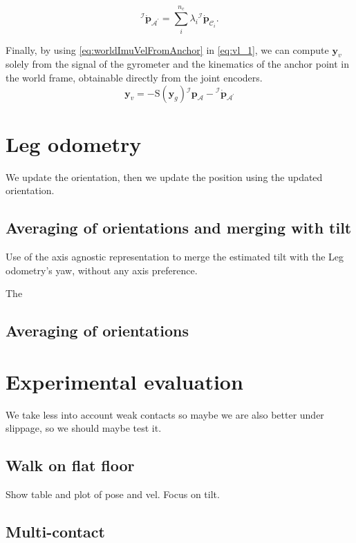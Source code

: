 \documentclass{IJCAS}
\begin{document}
\begin{equation}
    {^{\mathcal{I}}} \dot{\boldsymbol{p}}_{\mathcal{A}^{\prime}} = \sum^{n_{c}}_{i} \lambda_{i}  {^{\mathcal{I}}} \dot{\boldsymbol{p}}_{{\mathcal{C}}_{i}}.
\end{equation}

Finally, by using \eqref{eq:worldImuVelFromAnchor} in \eqref{eq:vl_1}, we can compute $\boldsymbol{y}_{v}$ solely from the signal of the gyrometer and the kinematics of the anchor point in the world frame, obtainable directly from the joint encoders.
\begin{equation}
    \boldsymbol{y}_v = - \text{S}\!\left( {\boldsymbol{y}_{g}} \right) {^{\mathcal{I}}}\boldsymbol{p}_{\mathcal{A}} - {^{\mathcal{I}}} \dot{\boldsymbol{p}}_{\mathcal{A}^{\prime}}
\end{equation}

\section{Leg odometry}


We update the orientation, then we update the position using the updated orientation.
\subsection{Averaging of orientations and merging with tilt}
Use of the axis agnostic representation to merge the estimated tilt with the Leg odometry's yaw, without any axis preference.

The 
\subsection{Averaging of orientations}



\section{Experimental evaluation}

We take less into account weak contacts so maybe we are also better under slippage, so we should maybe test it.


\subsection{Walk on flat floor}
Show table and plot of pose and vel. Focus on tilt.

\subsection{Multi-contact}
\end{document}
